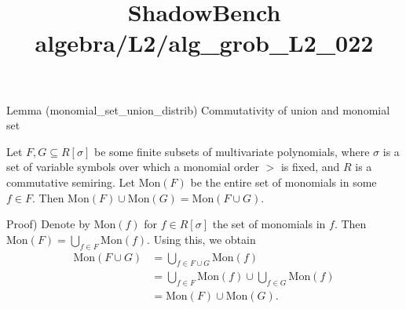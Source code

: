 \documentclass{article}
\title{ShadowBench algebra/L2/alg\_grob\_L2\_022}
\begin{document}
\maketitle

Lemma (monomial_set_union_distrib)
Commutativity of union and monomial set

Let $F, G \subseteq R[\sigma]$ be some finite subsets of multivariate polynomials, where $\sigma$ is a set of variable symbols over which a monomial order $>$ is fixed, and $R$ is a commutative semiring. Let $\mathrm{Mon}(F)$ be the entire set of monomials in some $f \in F$. Then $\mathrm{Mon}(F) \cup \mathrm{Mon}(G) = \mathrm{Mon}(F \cup G)$.

Proof)
Denote by $\mathrm{Mon}(f)$ for $f \in R[\sigma]$ the set of monomials in $f$. Then $\mathrm{Mon}(F) = \bigcup_{f \in F} \mathrm{Mon}(f)$. Using this, we obtain
$$
\begin{aligned}
\mathrm{Mon}(F \cup G)
&= \bigcup_{f \in F \cup G} \mathrm{Mon}(f) \\
&= \bigcup_{f \in F}  \mathrm{Mon}(f) \cup \bigcup_{f \in G} \mathrm{Mon}(f) \\
&= \mathrm{Mon}(F) \cup \mathrm{Mon}(G).
\end{aligned}
$$
\end{document}
